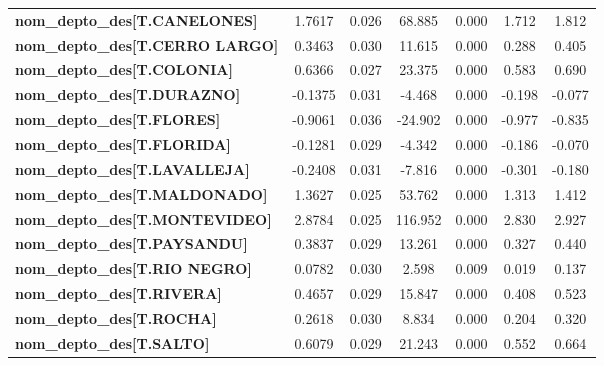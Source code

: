 \begin{center}
\begin{tabular}{lcccccc}
\textbf{nom\_depto\_des[T.CANELONES]}      &       1.7617  &        0.026     &    68.885  &         0.000        &        1.712    &        1.812     \\
\textbf{nom\_depto\_des[T.CERRO LARGO]}    &       0.3463  &        0.030     &    11.615  &         0.000        &        0.288    &        0.405     \\
\textbf{nom\_depto\_des[T.COLONIA]}        &       0.6366  &        0.027     &    23.375  &         0.000        &        0.583    &        0.690     \\
\textbf{nom\_depto\_des[T.DURAZNO]}        &      -0.1375  &        0.031     &    -4.468  &         0.000        &       -0.198    &       -0.077     \\
\textbf{nom\_depto\_des[T.FLORES]}         &      -0.9061  &        0.036     &   -24.902  &         0.000        &       -0.977    &       -0.835     \\
\textbf{nom\_depto\_des[T.FLORIDA]}        &      -0.1281  &        0.029     &    -4.342  &         0.000        &       -0.186    &       -0.070     \\
\textbf{nom\_depto\_des[T.LAVALLEJA]}      &      -0.2408  &        0.031     &    -7.816  &         0.000        &       -0.301    &       -0.180     \\
\textbf{nom\_depto\_des[T.MALDONADO]}      &       1.3627  &        0.025     &    53.762  &         0.000        &        1.313    &        1.412     \\
\textbf{nom\_depto\_des[T.MONTEVIDEO]}     &       2.8784  &        0.025     &   116.952  &         0.000        &        2.830    &        2.927     \\
\textbf{nom\_depto\_des[T.PAYSANDU]}       &       0.3837  &        0.029     &    13.261  &         0.000        &        0.327    &        0.440     \\
\textbf{nom\_depto\_des[T.RIO NEGRO]}      &       0.0782  &        0.030     &     2.598  &         0.009        &        0.019    &        0.137     \\
\textbf{nom\_depto\_des[T.RIVERA]}         &       0.4657  &        0.029     &    15.847  &         0.000        &        0.408    &        0.523     \\
\textbf{nom\_depto\_des[T.ROCHA]}          &       0.2618  &        0.030     &     8.834  &         0.000        &        0.204    &        0.320     \\
\textbf{nom\_depto\_des[T.SALTO]}          &       0.6079  &        0.029     &    21.243  &         0.000        &        0.552    &        0.664     \\

\end{tabular}
\end{center}
